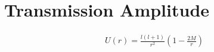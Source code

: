 \documentclass[12pt]{article}
\begin{document}
\section{Transmission Amplitude}

\begin{gather}
U(r)
=
\frac{l (l + 1)}{r^{2}}
(1 - \frac{2 M}{r})
\end{gather}
\end{document}
